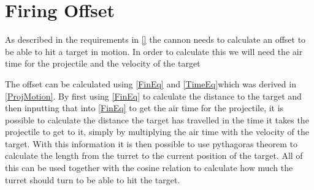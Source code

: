 \section{Firing Offset}
As described in the requirements in \autoref{} the cannon needs to calculate an
offset to be able to hit a target in motion. In order to calculate this we will
need the air time for the projectile and the velocity of the target\nl


The offset can be calculated using \autoref{FinEq} and \autoref{TimeEq}which was
derived in \autoref{ProjMotion}. By first using \autoref{FinEq} to calculate the
distance to the target and then inputting that into \autoref{FinEq} to get the
air time for the projectile, it is possible to calculate the distance the target
has travelled in the time it takes the projectile to get to it, simply by
multiplying the air time with the velocity of the target. With this information
it is then possible to use pythagoras theorem to calculate the length from the
turret to the current position of the target. All of this can be used together
with the cosine relation to calculate how much the turret should turn to be able
to hit the target.
